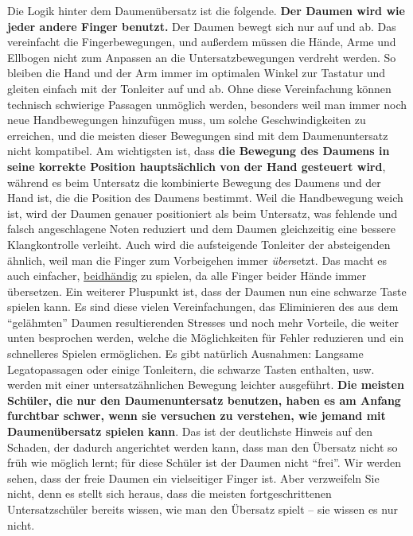 Die Logik hinter dem Daumenübersatz ist die folgende.
\textbf{Der Daumen wird wie jeder andere Finger benutzt.}
Der Daumen bewegt sich nur auf und ab.
Das vereinfacht die Fingerbewegungen, und außerdem müssen die Hände, Arme und Ellbogen nicht zum Anpassen an die Untersatzbewegungen verdreht werden.
So bleiben die Hand und der Arm immer im optimalen Winkel zur Tastatur und gleiten einfach mit der Tonleiter auf und ab.
Ohne diese Vereinfachung können technisch schwierige Passagen unmöglich werden, besonders weil man immer noch neue Handbewegungen hinzufügen muss, um solche Geschwindigkeiten zu erreichen, und die meisten dieser Bewegungen sind mit dem Daumenuntersatz nicht kompatibel.
Am wichtigsten ist, dass \textbf{die Bewegung des Daumens in seine korrekte Position hauptsächlich von der Hand gesteuert wird}, während es beim Untersatz die kombinierte Bewegung des Daumens und der Hand ist, die die Position des Daumens bestimmt.
Weil die Handbewegung weich ist, wird der Daumen genauer positioniert als beim Untersatz, was fehlende und falsch angeschlagene Noten reduziert und dem Daumen gleichzeitig eine bessere Klangkontrolle verleiht.
Auch wird die aufsteigende Tonleiter der absteigenden ähnlich, weil man die Finger zum Vorbeigehen immer \textit{über}setzt.
Das macht es auch einfacher, \hyperref[c1ii25]{beidhändig} zu spielen, da alle Finger beider Hände immer übersetzen.
Ein weiterer Pluspunkt ist, dass der Daumen nun eine schwarze Taste spielen kann.
Es sind diese vielen Vereinfachungen, das Eliminieren des aus dem \enquote{gelähmten} Daumen resultierenden Stresses und noch mehr Vorteile, die weiter unten besprochen werden, welche die Möglichkeiten für Fehler reduzieren und ein schnelleres Spielen ermöglichen.
Es gibt natürlich Ausnahmen: Langsame Legatopassagen oder einige Tonleitern, die schwarze Tasten enthalten, usw. werden mit einer untersatzähnlichen Bewegung leichter ausgeführt.
\textbf{Die meisten Schüler, die nur den Daumenuntersatz benutzen, haben es am Anfang furchtbar schwer, wenn sie versuchen zu verstehen, wie jemand mit Daumenübersatz spielen kann}.
Das ist der deutlichste Hinweis auf den Schaden, der dadurch angerichtet werden kann, dass man den Übersatz nicht so früh wie möglich lernt; für diese Schüler ist der Daumen nicht \enquote{frei}.
Wir werden sehen, dass der freie Daumen ein vielseitiger Finger ist.
Aber verzweifeln Sie nicht, denn es stellt sich heraus, dass die meisten fortgeschrittenen Untersatzschüler bereits wissen, wie man den Übersatz spielt -- sie wissen es nur nicht.

